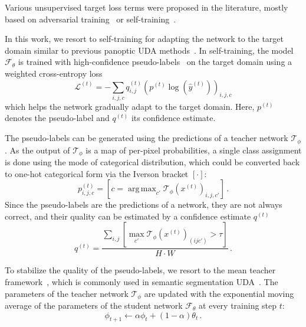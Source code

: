 \documentclass[10pt,twocolumn,letterpaper]{article}
\makeatletter
\renewcommand{\paragraph}{\@startsection{paragraph}{4}{\z@}{1.0ex \@plus 1ex \@minus .2ex}{-1em}{\normalfont\normalsize\bfseries}}
\DeclareMathOperator*{\argmax}{arg\,max}
\makeatother
\begin{document}
Various unsupervised target loss terms were proposed in the literature, mostly based on adversarial training~\cite{tsai2018learning,tsai2019domain,wang2020classes} or self-training~\cite{zou2018unsupervised,zhang2019category,mei2020instance,tranheden2021dacs,zhang2021prototypical,hoyer2021improving}.

\paragraph{Self-Training on Target Domain}
In this work, we resort to self-training for adapting the network to the target domain similar to previous panoptic UDA methods~\cite{xu2020cross, zhang2022hierarchical}. In self-training, the model $\mathcal{F}_{\theta}$ is trained with high-confidence pseudo-labels~\cite{lee2013pseudo} on the target domain using a weighted cross-entropy loss
\begin{equation}
  \mathcal{L}^{(t)} = -\sum_{i,j,c} 
  q^{(t)}_{i,j}
  \left( 
      p^{(t)} \log(\hat{y}^{(t)})
  \right)_{i,j,c}
\end{equation}
which helps the network gradually adapt to the target domain. Here, $p^{(t)}$ denotes the pseudo-label and $q^{(t)}$ its confidence estimate.

The pseudo-labels can be generated using the predictions of a teacher network $\mathcal{T}_{\phi}$. 
As the output of $\mathcal{T}_\phi$ is a map of per-pixel probabilities, a single class assignment is done using the mode of categorical distribution, which could be converted back to one-hot categorical form via the Iverson bracket $[\cdot]$:
\begin{equation}
    p_\mathit{i,j,c}^{(t)} = \left[
      c = \argmax_{c'} \mathcal{T}_\phi(x^{(t)})_{i,j,c'}
    \right]\,.
\end{equation}
Since the pseudo-labels are the predictions of a network,
they are not always correct, and their quality can be estimated by a confidence estimate $q^{(t)}$~\cite{zou2018unsupervised,mei2020instance,tranheden2021dacs,hoyer2021improving} 
\begin{equation}
    q^{(t)} = \frac{\sum_{i,j} \left[\max_{c'} \mathcal{T}_\phi(x^{(t)})_{(ijc')} > \tau\right]}{H \cdot W}\,.
\end{equation}

To stabilize the quality of the pseudo-labels, we resort to the mean teacher framework~\cite{tarvainen2017mean}, which is commonly used in semantic segmentation UDA~\cite{araslanov2021self,tranheden2021dacs,liu2021bapa,hoyer2021daformer}. The parameters of the teacher network $\mathcal{T}_{\phi}$ are updated with the exponential moving average of the parameters of the student network $\mathcal{F}_\theta$ at every training step $t$:
\begin{equation}
    \phi_{t+1} \leftarrow \alpha \phi_t + (1 - \alpha) \theta_t\,.
\end{equation}
\end{document}
